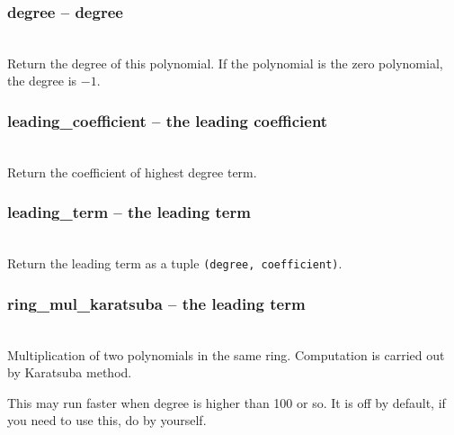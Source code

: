   \method
  \subsubsection{degree -- degree}
   \\
   \spacing
   Return the degree of this polynomial.
   If the polynomial is the zero polynomial, the degree is \(-1\).

  \subsubsection{leading\_coefficient -- the leading coefficient}
  \\

  Return the coefficient of highest degree term.

  \subsubsection{leading\_term -- the leading term}
  \\

  Return the leading term as a tuple {\tt (degree, coefficient)}.

  \subsubsection{\negok ring\_mul\_karatsuba -- the leading term}
  \\

  Multiplication of two polynomials in the same ring.
  Computation is carried out by Karatsuba method.

  This may run faster when degree is higher than 100 or so.
  It is off by default, if you need to use this, do by yourself.
\C



